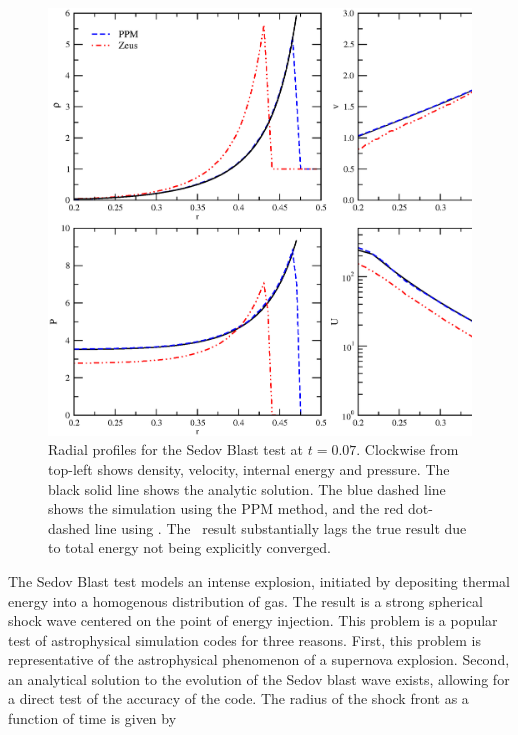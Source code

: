 \begin{figure}
\begin{center}
\includegraphics[width=\textwidth]{figures/sedov-profiles.eps}
\caption{Radial profiles for the Sedov Blast test at $t =
0.07$. Clockwise from top-left shows density, velocity, internal
energy and pressure.  The black solid line shows the analytic
solution.  The blue dashed line shows the simulation using the PPM
method, and the red dot-dashed line using \zeus.  The \zeus\ result
substantially lags the true result due to total energy not being
explicitly converged.}
\label{fig.sedov2}
\end{center}
\end{figure}

The Sedov Blast test \citep{Sedov1959} models an intense explosion,
initiated by depositing thermal energy into a homogenous distribution
of gas. The result is a strong spherical shock wave centered on the
point of energy injection.  This problem is a popular test of
astrophysical simulation codes for three reasons.  First, this problem
is representative of the astrophysical phenomenon of a supernova
explosion.   Second, an analytical solution to the evolution of the
Sedov blast wave exists, allowing for a direct test of the accuracy of
the code.  The radius of the shock front as a function of time is
given by

